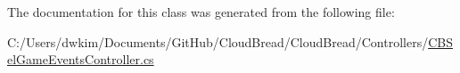 The documentation for this class was generated from the following file\+:\begin{DoxyCompactItemize}
\item 
C\+:/\+Users/dwkim/\+Documents/\+Git\+Hub/\+Cloud\+Bread/\+Cloud\+Bread/\+Controllers/\hyperlink{_c_b_sel_game_events_controller_8cs}{C\+B\+Sel\+Game\+Events\+Controller.\+cs}\end{DoxyCompactItemize}
